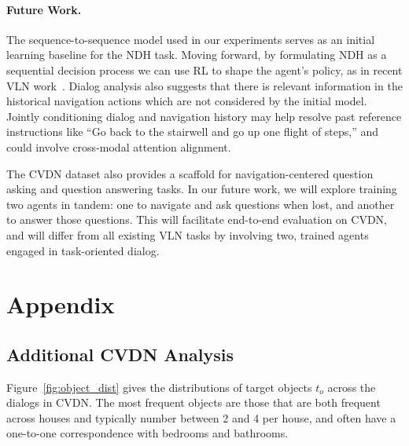 \documentclass{article}
\newcommand{\dataset}{CVDN}
\newcommand{\task}{NDH}
\begin{document}
\paragraph{Future Work.}
The sequence-to-sequence model used in our experiments serves as an initial learning baseline for the \task{} task.
Moving forward, by formulating \task{} as a sequential decision process we can use RL to shape the agent's policy, as in recent VLN work~\cite{tan:naacl19}.
Dialog analysis also suggests that there is relevant information in the historical navigation actions which are not considered by the initial model.
Jointly conditioning dialog and navigation history may help resolve past reference instructions like ``Go back to the stairwell and go up one flight of steps,'' and could involve cross-modal attention alignment.

The \dataset{} dataset also provides a scaffold for navigation-centered question asking and question answering tasks.
In our future work, we will explore training two agents in tandem: one to navigate and ask questions when lost, and another to answer those questions.
This will facilitate end-to-end evaluation on \dataset{}, and will differ from all existing VLN tasks by involving two, trained agents engaged in task-oriented dialog.
 
\clearpage
{}



  

\newpage
\section{Appendix}
\label{sec:appendix}

\subsection{Additional \dataset{} Analysis}

Figure~\ref{fig:object_dist} gives the distributions of target objects $t_o$ across the dialogs in \dataset{}.
The most frequent objects are those that are both frequent across houses and typically number between 2 and 4 per house, and often have a one-to-one correspondence with bedrooms and bathrooms.
\end{document}
